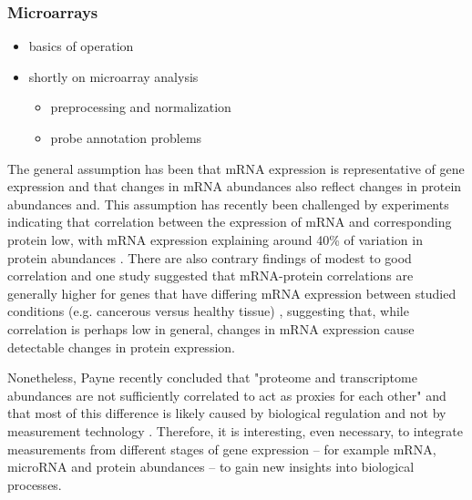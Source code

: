 \subsubsection{Microarrays}

\begin{itemize}
  \item basics of operation
  \item shortly on microarray analysis
  \begin{itemize}
    \item preprocessing and normalization
    \item probe annotation problems
  \end{itemize}
\end{itemize}

The general assumption has been that mRNA expression is representative of gene
expression and that changes in mRNA abundances also reflect changes in protein
abundances and. This assumption has recently been challenged by experiments
indicating that correlation between the expression of mRNA and corresponding
protein low, with mRNA expression explaining around 40\% of variation in
protein abundances \citep{Vogel2012}. There are also contrary findings of
modest to good correlation and one study suggested that mRNA-protein
correlations are generally higher for genes that have differing mRNA
expression between studied conditions (e.g. cancerous versus healthy tissue)
\citep{Koussounadis2015}, suggesting that, while correlation is perhaps low in
general, changes in mRNA expression cause detectable changes in protein
expression.

Nonetheless, Payne recently concluded that "proteome and transcriptome
abundances are not sufficiently correlated to act as proxies for each other"
and that most of this difference is likely caused by biological regulation and
not by measurement technology \cite{Payne2015}.
Therefore, it is interesting, even necessary, to integrate measurements from
different stages of gene expression -- for example mRNA, microRNA and protein
abundances -- to gain new insights into biological processes.
